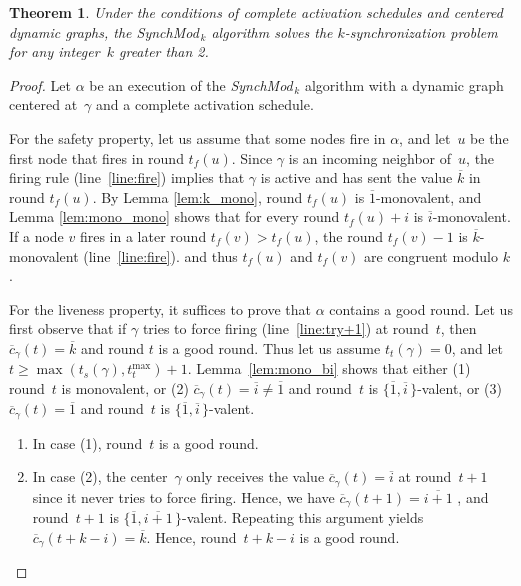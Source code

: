 \documentclass{article}
\newtheorem{theorem}{Theorem}
\newcommand{\cent}{\gamma}
\newcommand{\tf}{t_{f}}
\newcommand{\try}{t_{t}}
\newcommand{\SM}{{\em SynchMod}$_{\,k}$ }
\begin{document}
\begin{theorem}
Under the conditions of complete activation schedules and centered dynamic graphs,
	the \SM algorithm solves the $k$-synchronization problem for any integer~$k$ greater than 2.
\end{theorem}

\begin{proof}
Let $\alpha$ be an execution of the \SM algorithm with a dynamic graph centered at~$\cent$ 
	and a complete activation schedule.
	
For the safety property, let us assume that some nodes fire in $\alpha$, and let~$u$ be the first node that fires in round $\tf(u)$.
Since $\cent $ is an incoming neighbor of~$u$, the firing rule (line~\ref{line:fire}) implies that $\cent$ is active
	and has sent the value  $\overline{k}$ in round $\tf(u)$.
By Lemma \ref{lem:k_mono},   round $\tf(u)$ is $\overline{1}$-monovalent, and
	Lemma \ref{lem:mono_mono} shows that for every round $\tf(u)+i$ is $\overline{i}$-monovalent.
If a node $v$ fires in a later round $\tf(v) > \tf(u)$, the round $\tf(v)-1$  is $\overline{k}$-monovalent (line~\ref{line:fire}).
	and thus $\tf(u)$ and $\tf(v)$ are congruent modulo $k$.
		
For the liveness property, it suffices to prove that  $\alpha$ contains a good round.
Let us first observe that if $\cent$ tries to force firing (line~\ref{line:try+1}) at round~$t$,
	 then $ \overline{c}_{\cent}(t) = \overline{k}$ and round $t$ is a good round.
Thus let us assume  $\try(\cent) = 0$, and  let $t \geq \max (t_s(\cent) , \try^{\max}) +1$.
Lemma~\ref{lem:mono_bi}  shows that either (1) round~$t$ is monovalent, 
	or (2) $ \overline{c}_{\cent}(t) = \overline{i} \neq  \overline{1} $ and round~$t$ is $ \{\overline{1}, \overline{i} \, \}$-valent,
	or (3) $ \overline{c}_{\cent}(t) = \overline{1}$ and round~$t$ is $ \{\overline{1}, \overline{i} \, \}$-valent.
\begin{enumerate}
\item In case (1), round~$t$ is a good round.

\item In case (2), the center~$\cent$ only receives the value $ \overline{c}_{\cent}(t) = \overline{i}$ at round~$t+1$ 
since it never tries to force firing.
Hence, we have $ \overline{c}_{\cent}(t + 1)  = \overline{i +1} $ , and round~$t+1 $ is $ \{\overline{1}, \overline{i+1} \, \}$-valent.
Repeating this argument yields $ \overline{c}_{\cent}(t + k-i )  = \overline{ k } $.
Hence, round~$t +k-i$ is a good round.


\end{enumerate}
\end{proof}
\end{document}
